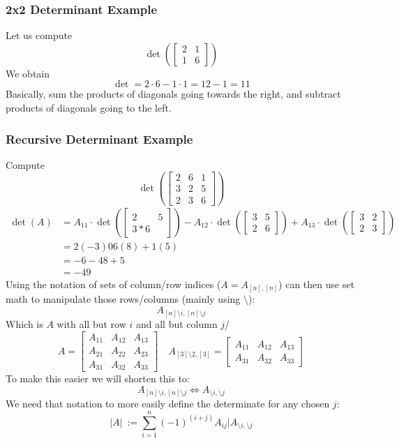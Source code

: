 \documentclass[10pt]{article}
\begin{document}
\subsubsection*{2x2 Determinant Example}
Let us compute
\[\det \left(\begin{bmatrix} 2 & 1 \\ 1 & 6 \end{bmatrix}\right)\]
We obtain
\[\det = 2 \cdot 6 - 1 \cdot 1 = 12 - 1 = 11\]
Basically, sum the products of diagonals going towards the right, and subtract products of diagonals going to the left.

\subsubsection*{Recursive Determinant Example}
Compute 
\[\det \left(\begin{bmatrix} 2 & 6 & 1 \\ 3 & 2 & 5 \\ 2 & 3 & 6 \end{bmatrix}\right)\]
\begin{align*}
    \det(A) &= A_{11} \cdot \det \left(\begin{bmatrix} 2 & 5 \\ 3 * 6 \end{bmatrix}\right) - A_{12} \cdot \det \left(\begin{bmatrix} 3 & 5 \\ 2 & 6 \end{bmatrix}\right) + A_{13} \cdot \det \left(\begin{bmatrix} 3 & 2 \\ 2 & 3 \end{bmatrix}\right)\\
    &= 2 (-3) 0 6(8) + 1(5)\\
    &= -6 - 48 + 5\\
    &= -49
\end{align*}
Using the notation of sets of column/row indices ($A = A_{[n], [n]}$) can then use set math to manipulate those rows/columns (mainly using $\setminus$):
\[A_{[n]\setminus i, [n] \setminus j}\]
Which is $A$ with all but row $i$ and all but column $j$/
\[A = \begin{bmatrix} A_{11} & A_{12} & A_{13} \\ A_{21} & A_{22} & A_{23} \\ A_{31} & A_{32} & A_{33} \end{bmatrix} \quad A_{[3] \setminus 2, [3]} = \begin{bmatrix} A_{11} & A_{12} & A_{13} \\ A_{31} & A_{32} & A_{33} \end{bmatrix}\]
To make this easier we will shorten this to:
\[A_{[n] \setminus i, [n] \setminus j} \Leftrightarrow A_{\setminus i, \setminus j}\]
We need that notation to more easily define the determinate for any chosen $j$:
\[|A| \::= \sum_{i = 1}^n (-1)^{(i + j)} A_{ij} |A_{\setminus i, \setminus j}\]
\end{document}
